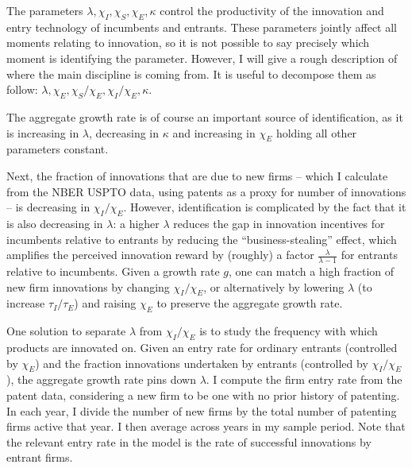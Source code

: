 \documentclass[12pt,english]{article}
\theoremstyle{remark}
\begin{document}
The parameters $\lambda, \chi_I, \chi_S, \chi_E, \kappa$ control the productivity of the innovation and entry technology of incumbents and entrants. These parameters jointly affect all moments relating to innovation, so it is not possible to say precisely which moment is identifying the parameter. However, I will give a rough description of where the main discipline is coming from. It is useful to decompose them as follow: $\lambda , \chi_E, \chi_S / \chi_E, \chi_I / \chi_E, \kappa$. 

The aggregate growth rate is of course an important source of identification, as it is increasing in $\lambda$, decreasing in $\kappa$ and increasing in $\chi_E$ holding all other parameters constant. 

Next, the fraction of innovations that are due to new firms -- which I calculate from the NBER USPTO data, using patents as a proxy for number of innovations -- is decreasing in $\chi_I / \chi_E$. However, identification is complicated by the fact that it is also decreasing in $\lambda$: a higher $\lambda$ reduces the gap in innovation incentives for incumbents relative to entrants by reducing the ``business-stealing'' effect, which amplifies the perceived innovation reward by (roughly) a factor $\frac{\lambda}{\lambda-1}$ for entrants relative to incumbents. Given a growth rate $g$, one can match a high fraction of new firm innovations by changing $\chi_I / \chi_E$, or alternatively by lowering $\lambda$ (to increase $\tau_I / \tau_E$) and raising $\chi_E$ to preserve the aggregate growth rate.  

One solution to separate $\lambda$ from $\chi_I / \chi_E$ is to study the frequency with which products are innovated on. Given an entry rate for ordinary entrants (controlled by $\chi_E$) and the fraction innovations undertaken by entrants (controlled by $\chi_I / \chi_E$), the aggregate growth rate pins down $\lambda$. I compute the firm entry rate from the patent data, considering a new firm to be one with no prior history of patenting. In each year, I divide the number of new firms by the total number of patenting firms active that year. I then average across years in my sample period. Note that the relevant entry rate in the model is the rate of successful innovations by entrant firms.
\end{document}
